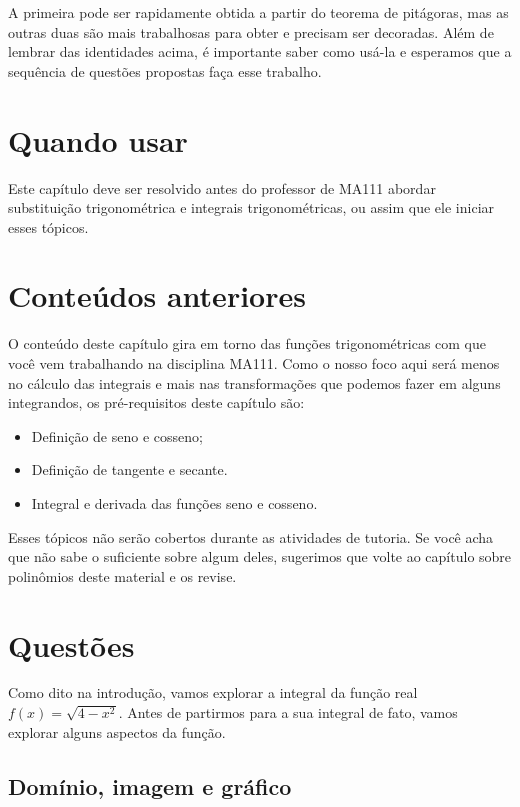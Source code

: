 \documentclass[main_estudante.tex]{subfiles}
\begin{document}
A primeira pode ser rapidamente obtida a partir do teorema de pitágoras, mas as outras duas são mais trabalhosas para obter e precisam ser decoradas. Além de lembrar das identidades acima, é importante saber como usá-la e esperamos que a sequência de questões propostas faça esse trabalho.

\paraAmbos

\section{Quando usar}

Este capítulo deve ser resolvido antes do professor de MA111 abordar substituição trigonométrica e integrais trigonométricas, ou assim que ele iniciar esses tópicos.

\section{Conteúdos anteriores}

O conteúdo deste capítulo gira em torno das funções trigonométricas com que você vem trabalhando na disciplina MA111. Como o nosso foco aqui será menos no cálculo das integrais e mais nas transformações que podemos fazer em alguns integrandos, os pré-requisitos deste capítulo são:
\begin{itemize}
 \item Definição de seno e cosseno;
 \item Definição de tangente e secante.
 \item Integral e derivada das funções seno e cosseno.
\end{itemize}

Esses tópicos não serão cobertos durante as atividades de tutoria. Se você acha que não sabe o suficiente sobre algum deles, sugerimos que volte ao capítulo sobre polinômios deste material e os revise.

\newpage

\section{Questões}

Como dito na introdução, vamos explorar a integral da função real $f(x)=\sqrt{4-x^2}$. Antes de partirmos para a sua integral de fato, vamos explorar alguns aspectos da função.

\subsection*{Domínio, imagem e gráfico}
\end{document}
